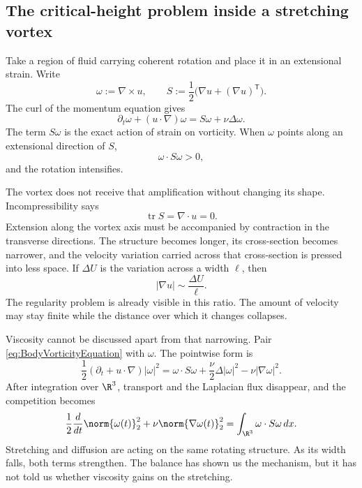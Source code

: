 \subsection{The critical-height problem inside a stretching vortex}\label{sub:ThePerfectlyStretchingVortex}

Take a region of fluid carrying coherent rotation and place it in an
extensional strain.  Write
\[
  \omega:=\nabla\times u,
  \qquad
  S:=\frac12\bigl(\nabla u+(\nabla u)^{\mathsf T}\bigr).
\]
The curl of the momentum equation gives
\begin{equation}\label{eq:BodyVorticityEquation}
  \partial_t\omega+(u\cdot\nabla)\omega
  =S\omega+\nu\Delta\omega.
\end{equation}
The term \(S\omega\) is the exact action of strain on vorticity.  When
\(\omega\) points along an extensional direction of \(S\),
\[
  \omega\cdot S\omega>0,
\]
and the rotation intensifies.

The vortex does not receive that amplification without changing its shape.
Incompressibility says
\[
  \operatorname{tr}S=\nabla\cdot u=0.
\]
Extension along the vortex axis must be accompanied by contraction in the
transverse directions.  The structure becomes longer, its cross-section
becomes narrower, and the velocity variation carried across that
cross-section is pressed into less space.  If \(\Delta U\) is the variation
across a width \(\ell\), then
\[
  |\nabla u|\sim\frac{\Delta U}{\ell}.
\]
The regularity problem is already visible in this ratio.  The amount of
velocity may stay finite while the distance over which it changes collapses.

Viscosity cannot be discussed apart from that narrowing.  Pair
\eqref{eq:BodyVorticityEquation} with \(\omega\).  The pointwise form is
\[
  \frac12(\partial_t+u\cdot\nabla)|\omega|^2
  =\omega\cdot S\omega
  +\frac\nu2\Delta|\omega|^2
  -\nu|\nabla\omega|^2.
\]
After integration over \(\R^3\), transport and the Laplacian flux disappear,
and the competition becomes
\begin{equation}\label{eq:BodyEnstrophyBalance}
  \frac12\frac d{dt}\norm{\omega(t)}_2^2
  +\nu\norm{\nabla\omega(t)}_2^2
  =\int_{\R^3}\omega\cdot S\omega\,dx.
\end{equation}
Stretching and diffusion are acting on the same rotating structure.  As its
width falls, both terms strengthen.  The balance has shown us the mechanism,
but it has not told us whether viscosity gains on the stretching.

